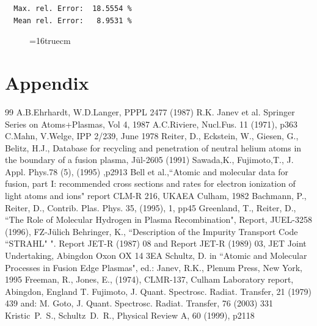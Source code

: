 \documentclass[12pt,dvips]{article}
\begin{document}
\begin{small}
\begin{verbatim}
  Max. rel. Error:  18.5554 %
  Mean rel. Error:   8.9531 %

\end{verbatim}\end{small}
\begin{figure} \label{2.0c}
\epsfxsize=16truecm
\end{figure}
\newpage

\section{Appendix}
\newpage
\begin{thebibliography}{99}
  A.B.Ehrhardt, W.D.Langer, PPPL 2477 (1987)
 R.K. Janev et al.  Springer Series on Atoms+Plasmas,
                   Vol 4, 1987
 A.C.Riviere, Nucl.Fus. 11 (1971), p363
 C.Mahn, V.Welge, IPP 2/239, June 1978
 Reiter, D., Eckstein, W., Giesen, G., Belitz,
                    H.J.,
                    Database for recycling and penetration of neutral
                    helium atoms in the boundary of a fusion plasma,
                    J\"ul-2605 (1991)
 Sawada,K.,  Fujimoto,T., J. Appl. Phys.78 (5), (1995)
                    ,p2913
  Bell et al.,``Atomic and molecular data for fusion, part I:
recommended cross sections and rates for electron ionization of light atoms and ions"
 report CLM-R 216, UKAEA Culham, 1982
  Bachmann, P., Reiter, D., Contrib. Plas. Phys.
                       35, (1995), 1, pp45
 Greenland, T., Reiter, D.,
                   ``The Role of Molecular Hydrogen in Plasma
                    Recombination", Report, JUEL-3258 (1996), FZ-J\"ulich
 Behringer, K.,
``Description of the Impurity Transport Code ``STRAHL" ".
Report JET-R (1987) 08 and
Report JET-R (1989) 03, JET Joint Undertaking, Abingdon Oxon OX 14 3EA
 Schultz, D. in ``Atomic and Molecular Processes in Fusion
                     Edge Plasmas", ed.: Janev, R.K., Plenum Press, New York, 1995
 Freeman, R., Jones, E., (1974), CLMR-137, Culham Laboratory report, Abingdon, England
 T.  Fujimoto, J. Quant. Spectrosc. Radiat. Transfer, 21 (1979) 439 and:
M. Goto, J. Quant. Spectrosc. Radiat. Transfer, 76 (2003) 331
 Kristic~P.~S., Schultz~D.~R., Physical Review A, 60 (1999), p2118
 \end{thebibliography}
\end{document}
